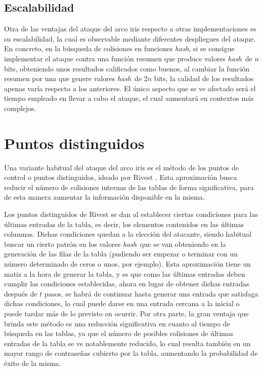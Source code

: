 \documentclass[12pt,spanish,listoffigures,listoftables,listofalgorithms]{tfgetsinf}
\newcommand{\hash}{\textit{hash}}
\begin{document}
\subsection{Escalabilidad}

Otra de las ventajas del ataque del arco iris respecto a otras implementaciones es su escalabilidad, la cual es observable mediante diferentes despliegues del ataque. En concreto, en la búsqueda de colisiones en funciones \hash, si se consigue implementar el ataque contra una función resumen que produce valores \hash~de $n$ bits, obteniendo unos resultados calificados como buenos, al cambiar la función resumen por una que genere valores \hash~de $2n$ bits, la calidad de los resultados apenas varía respecto a los anteriores. El único aspecto que se ve afectado será el tiempo empleado en llevar a cabo el ataque, el cual aumentará en contextos más complejos.

\section{Puntos distinguidos}\label{puntosdist}

Una variante habitual del ataque del arco iris es el método de los puntos de control o puntos distinguidos, ideado por Rivest \cite{rivest}. Esta aproximación busca reducir el número de colisiones internas de las tablas de forma significativa, para de esta manera aumentar la información disponible en la misma.

Los puntos distinguidos de Rivest se dan al establecer ciertas condiciones para las últimas entradas de la tabla, es decir, los elementos contenidos en las últimas columnas. Dichas condiciones quedan a la elección del atacante, siendo habitual buscar un cierto patrón en los valores \hash~que se van obteniendo en la generación de las filas de la tabla (pudiendo ser empezar o terminar con un número determinado de ceros o unos, por ejemplo). Esta aproximación tiene un matiz a la hora de generar la tabla, y es que como las últimas entradas deben cumplir las condiciones establecidas, ahora en lugar de obtener dichas entradas después de $t$ pasos, se habrá de continuar hasta generar una entrada que satisfaga dichas condiciones, lo cual puede darse en una entrada cercana a la inicial o puede tardar más de lo previsto en ocurrir. Por otra parte, la gran ventaja que brinda este método es una reducción significativa en cuanto al tiempo de búsqueda en las tablas, ya que el número de posibles colisiones de últimas entradas de la tabla se ve notablemente reducido, lo cual resulta también en un mayor rango de contraseñas cubierto por la tabla, aumentando la probabilidad de éxito de la misma.
\end{document}

